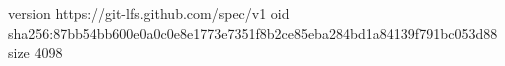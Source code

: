 version https://git-lfs.github.com/spec/v1
oid sha256:87bb54bb600e0a0c0e8e1773e7351f8b2ce85eba284bd1a84139f791bc053d88
size 4098
